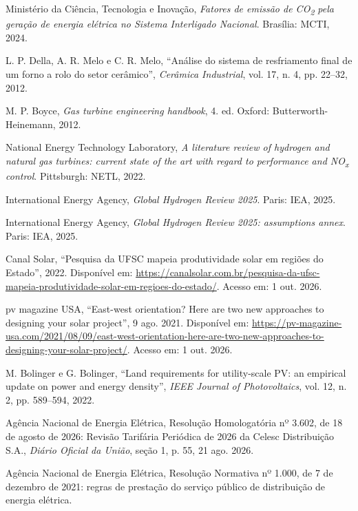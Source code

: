  Ministério da Ciência, Tecnologia e Inovação, \textit{Fatores de emissão de CO\textsubscript{2} pela geração de energia elétrica no Sistema Interligado Nacional}. Brasília: MCTI, 2024.

 L. P. Della, A. R. Melo e C. R. Melo, ``Análise do sistema de resfriamento final de um forno a rolo do setor cerâmico'', \textit{Cerâmica Industrial}, vol. 17, n. 4, pp. 22--32, 2012.

 M. P. Boyce, \textit{Gas turbine engineering handbook}, 4. ed. Oxford: Butter\-worth-Heine\-mann, 2012.

 National Energy Technology Laboratory, \textit{A literature review of hydrogen and natural gas turbines: current state of the art with regard to performance and NO\textsubscript{x} control}. Pittsburgh: NETL, 2022.

 International Energy Agency, \textit{Global Hydrogen Review 2025}. Paris: IEA, 2025.

 International Energy Agency, \textit{Global Hydrogen Review 2025: assumptions annex}. Paris: IEA, 2025.

 Canal Solar, ``Pesquisa da UFSC mapeia produtividade solar em regiões do Estado'', 2022. Disponível em: \url{https://canalsolar.com.br/pesquisa-da-ufsc-mapeia-produtividade-solar-em-regioes-do-estado/}. Acesso em: 1 out. 2026.

 pv magazine USA, ``East-west orientation? Here are two new approaches to designing your solar project'', 9 ago. 2021. Disponível em: \url{https://pv-magazine-usa.com/2021/08/09/east-west-orientation-here-are-two-new-approaches-to-designing-your-solar-project/}. Acesso em: 1 out. 2026.

 M. Bolinger e G. Bolinger, ``Land requirements for utility-scale PV: an empirical update on power and energy density'', \textit{IEEE Journal of Photovoltaics}, vol. 12, n. 2, pp. 589--594, 2022.

 Agência Nacional de Energia Elétrica, Resolução Homologatória nº 3.602, de 18 de agosto de 2026: Revisão Tarifária Periódica de 2026 da Celesc Distribuição S.A., \textit{Diário Oficial da União}, seção 1, p. 55, 21 ago. 2026.

 Agência Nacional de Energia Elétrica, Resolução Normativa nº 1.000, de 7 de dezembro de 2021: regras de prestação do serviço público de distribuição de energia elétrica.

